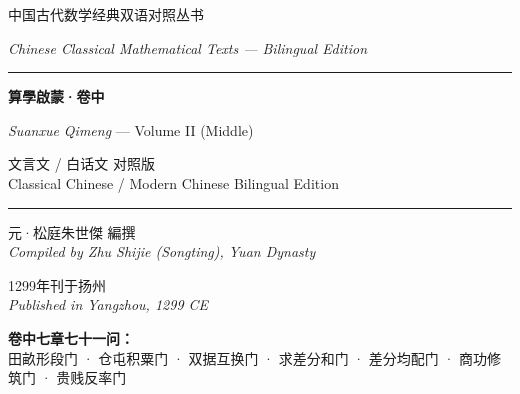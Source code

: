 \documentclass[11pt,a4paper]{article}
\newcommand{\longline}{\noindent\rule{\textwidth}{0.4pt}}
\begin{document}
\begin{titlepage}
\centering
\vspace*{1.5cm}

{\fontsize{12}{14}\selectfont\textsc{中国古代数学经典双语对照丛书}}
\vspace{0.5cm}

{\fontsize{10}{12}\selectfont\textit{Chinese Classical Mathematical Texts --- Bilingual Edition}}
\vspace{0.8cm}

\longline
\vspace{1.2cm}

{\fontsize{26}{32}\selectfont\bfseries\color{titlecolor}
算學啟蒙·卷中\\[0.5cm]
}
\vspace{0.3cm}

{\fontsize{16}{20}\selectfont\color{sectioncolor}
\textit{Suanxue Qimeng} --- Volume II (Middle)\\[0.3cm]
}

\vspace{0.5cm}

{\fontsize{22}{26}\selectfont\color{chaptercolor}
文言文 / 白话文 对照版\\[0.2cm]
{\large Classical Chinese / Modern Chinese Bilingual Edition}
}

\vspace{1.5cm}
\longline
\vspace{0.8cm}

{\large 元·松庭朱世傑 編撰\\[0.3cm]
\textit{Compiled by Zhu Shijie (Songting), Yuan Dynasty}\\[0.5cm]
}

\vspace{0.3cm}

{\large 1299年刊于扬州\\[0.3cm]
\textit{Published in Yangzhou, 1299 CE}\\[0.5cm]
}

\vspace{0.8cm}

\begin{minipage}{0.85\textwidth}
\centering
\textbf{卷中七章七十一问：}\\[0.3cm]
田畝形段门 · 仓屯积粟门 · 双据互换门 · 求差分和门 · 差分均配门 · 商功修筑门 · 贵贱反率门
\end{minipage}

\vspace{1cm}


\end{titlepage}
\end{document}
